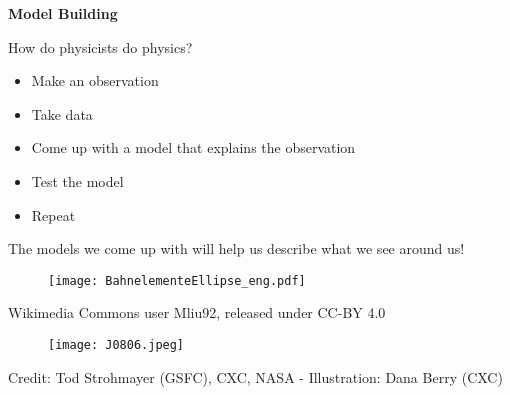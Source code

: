 \documentclass[]{article}
\begin{document}
\begin{PresentSpace}
\begin{center}
	\textbf{Model Building}
\end{center}
How do physicists do physics?
\begin{itemize}
	\item Make an observation
	\item Take data
	\item Come up with a model that explains the observation
	\item Test the model
	\item Repeat
\end{itemize}
The models we come up with will help us describe what we see around us!
\begin{figure}[h]
	\centering
	\texttt{[image: BahnelementeEllipse\_eng.pdf]}
\end{figure}

\begin{center}
	\small Wikimedia Commons user Mliu92, released under CC-BY 4.0
\end{center}

\begin{figure}[h]
	\centering
	\texttt{[image: J0806.jpeg]}
\end{figure}

\begin{center}
	\small Credit: Tod Strohmayer (GSFC), CXC, NASA - Illustration: Dana Berry (CXC)
\end{center}
\end{PresentSpace}
\newpage
\end{document}
